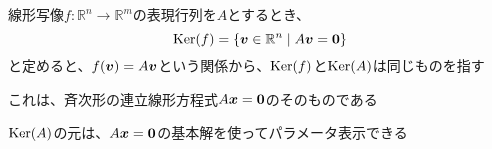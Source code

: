 \documentclass[../../../topic_linear-algebra]{subfiles}
\begin{document}
線形写像$f\colon \mathbb{R}^n \to \mathbb{R}^m$の表現行列を$A$とするとき、
\begin{equation*}
  \operatorname{Ker}(f) = \{ \vb*{v} \in \mathbb{R}^n \mid A\vb*{v} = \vb*{0} \}
\end{equation*}
と定めると、$f(\vb*{v}) = A\vb*{v}$という関係から、$\operatorname{Ker}(f)$と$\operatorname{Ker}(A)$は同じものを指す

\br

これは、斉次形の連立線形方程式$A\vb*{x} = \vb*{0}$のそのものである

$\operatorname{Ker}(A)$の元は、$A\vb*{x} = \vb*{0}$の基本解を使ってパラメータ表示できる
\end{document}
